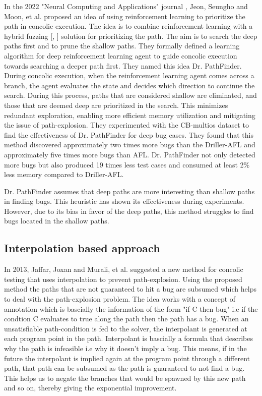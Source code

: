 \documentclass[	runningheads,
				a4paper]{llncs}
\begin{document}
In the 2022 "Neural Computing and Applications" journal \cite{drPathfinder2022}, Jeon, Seungho and Moon, et al. proposed an idea \cite[Dr. PathFinder]{drPathfinder2022} of using reinforcement learning to prioritize the path in concolic execution. The idea is to combine reinforcement learning with a hybrid fuzzing [\cite{miller1990empirical}, \cite{godefroid2012sage}] solution for prioritizing the path. The aim is to search the deep paths first and to prune the shallow paths. They formally defined a learning algorithm for deep reinforcement learning agent to guide concolic execution towards searching a deeper path first. They named this idea Dr. PathFinder. During concolic execution, when the reinforcement learning agent comes across a branch, the agent evaluates the state and decides which direction to continue the search. During this process, paths that are considered shallow are eliminated, and those that are deemed deep are prioritized in the search. This minimizes redundant exploration, enabling more efficient memory utilization and mitigating the issue of path-explosion. They experimented with the CB-multios dataset to find the effectiveness of Dr. PathFinder for deep bug cases.  They found that this method discovered approximately two times more bugs than the Driller-AFL and approximately five times more bugs than AFL. Dr. PathFinder not only detected more bugs but also produced 19 times less test cases and consumed at least 2\% less memory compared to Driller-AFL. 

Dr. PathFinder assumes that deep paths are more interesting than shallow paths in finding bugs. This heuristic has shown its effectiveness during experiments. However, due to its bias in favor of the deep paths, this method struggles to find bugs located in the shallow paths.


\subsection{Interpolation based approach}
In 2013, Jaffar, Joxan and Murali, et al. suggested a new method \cite{jaffar2013boosting} for concolic testing that uses interpolation to prevent path-explosion. Using the proposed method the paths that are not guaranteed to hit a bug are subsumed which helps to deal with the path-explosion problem. The idea works with a concept of annotation which is bascially the  information of the form "if C then bug" i.e if the condtion C evaluates to true along the path then the path has a bug. When an unsatisfiable path-condition is fed to the solver, the interpolant is generated at each program point in the path. Interpolant is bascially a formula that describes why the path is infeasible i.e why it doesn't imply a bug. This means, if in the future the interpolant is implied again at the program point through a different path, that path can be subsumed as the path is guaranteed to not find a bug. This helps us to negate the branches that would be spawned by this new path and so on, thereby giving the exponential improvement.
\end{document}

